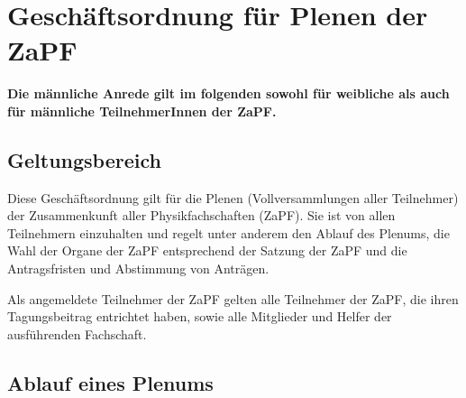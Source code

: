 \documentclass[draft,12pt,oneside]{scrreprt}
\begin{document}
\chapter*{Geschäftsordnung für Plenen der ZaPF}

\textbf{Die männliche Anrede gilt im folgenden sowohl für weibliche als auch für
männliche TeilnehmerInnen der ZaPF.}

\section{Geltungsbereich}

Diese Geschäftsordnung gilt für die Plenen (Vollversammlungen aller Teilnehmer)
der Zusammenkunft aller Physikfachschaften (ZaPF).
Sie ist von allen Teilnehmern einzuhalten und regelt unter anderem den Ablauf
des Plenums, die Wahl der Organe der ZaPF entsprechend der Satzung der ZaPF und
die Antragsfristen und Abstimmung von Anträgen.

Als angemeldete Teilnehmer der ZaPF gelten alle Teilnehmer der ZaPF, die ihren
Tagungsbeitrag entrichtet haben, sowie alle Mitglieder und Helfer der ausführenden
Fachschaft.

\section{Ablauf eines Plenums}
\end{document}
